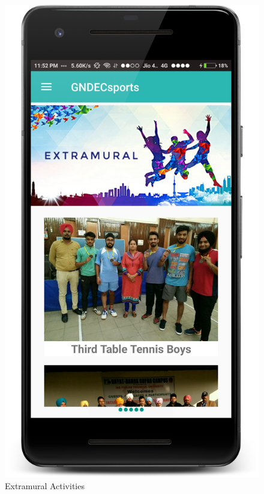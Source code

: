 \begin{figure}[ht]
\centering
\includegraphics[scale=0.20]{images/S7.png}
\caption{Extramural Activities}
\end{figure}

\newpage

